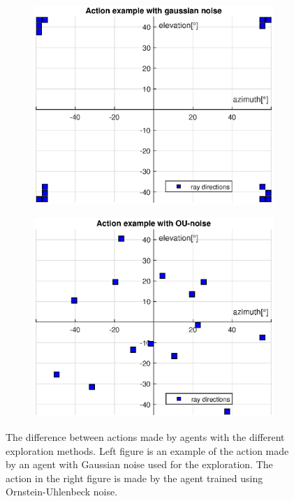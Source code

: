 \begin{figure}[H]
\begin{subfigure}[h]{0.5\linewidth}
\includegraphics[width=\linewidth]{fig/wrong_action.eps}
\end{subfigure}
\hfill
\begin{subfigure}[h]{0.5\linewidth}
\includegraphics[width=\linewidth]{fig/right_action.eps}
\end{subfigure}
\captionsetup{width=1\textwidth}
\caption[Difference between exploration methods]{The difference between actions made by agents with the different exploration methods. Left figure is an example of the action made by an agent with Gaussian noise used for the exploration. The action in the right figure is made by the agent trained using Ornstein-Uhlenbeck noise.}
\label{fig:expdiff}
\end{figure}

